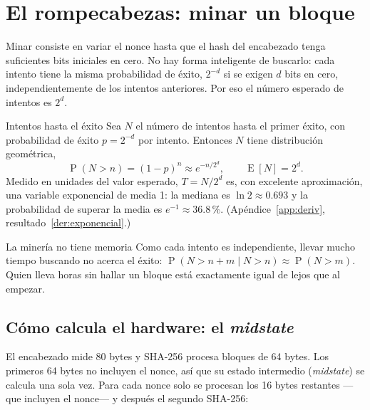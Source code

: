 \documentclass[11pt,a4paper]{article}
\newcommand{\Prob}[1]{\operatorname{P}\!\left(#1\right)}
\newcommand{\Esp}[1]{\operatorname{E}\!\left[#1\right]}
\newcommand{\webhint}[1]{}
\begin{document}
\section{El rompecabezas: minar un bloque}\label{sec:minar}
\webhint{section; id=sec-minar; slug=minar-un-bloque; kicker=06 — el rompecabezas; role=narrative+widget}

Minar consiste en variar el nonce hasta que el hash del encabezado tenga suficientes bits iniciales en cero. No hay forma inteligente de buscarlo: cada intento tiene la misma probabilidad de éxito, $2^{-d}$ si se exigen $d$ bits en cero, independientemente de los intentos anteriores. Por eso el número esperado de intentos es $2^{d}$.

\begin{resultado}{Intentos hasta el éxito}\label{res:geometrica}
Sea $N$ el número de intentos hasta el primer éxito, con probabilidad de éxito $p=2^{-d}$ por intento. Entonces $N$ tiene distribución geométrica,
\[
  \Prob{N>n}=(1-p)^n\approx e^{-n/2^{d}},\qquad \Esp{N}=2^{d}.
\]
Medido en unidades del valor esperado, $T=N/2^{d}$ es, con excelente aproximación, una variable exponencial de media 1: la mediana es $\ln 2\approx 0.693$ y la probabilidad de superar la media es $e^{-1}\approx 36.8\,\%$. (Apéndice~\ref{app:deriv}, resultado~\ref{der:exponencial}.)
\end{resultado}

\begin{nota}{La minería no tiene memoria}\label{nota:memoria}
Como cada intento es independiente, llevar mucho tiempo buscando no acerca el éxito: $\Prob{N>n+m\mid N>n}\approx\Prob{N>m}$. Quien lleva horas sin hallar un bloque está exactamente igual de lejos que al empezar.
\end{nota}

\subsection{Cómo calcula el hardware: el \emph{midstate}}

El encabezado mide 80 bytes y SHA-256 procesa bloques de 64 bytes. Los primeros 64 bytes no incluyen el nonce, así que su estado intermedio (\emph{midstate}) se calcula una sola vez. Para cada nonce solo se procesan los 16 bytes restantes ---que incluyen el nonce--- y después el segundo SHA-256:
\end{document}
